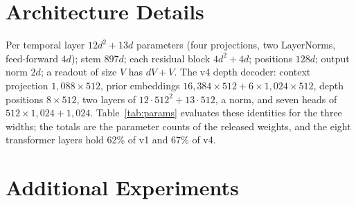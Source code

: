 \section{Architecture Details}
\label{app:params}

Per temporal layer $12d^2 + 13d$ parameters (four projections, two LayerNorms, feed-forward $4d$); stem $897d$; each residual block $4d^2 + 4d$; positions $128d$; output norm $2d$; a readout of size $V$ has $dV + V$. The v4 depth decoder: context projection $1{,}088 \times 512$, prior embeddings $16{,}384 \times 512 + 6 \times 1{,}024 \times 512$, depth positions $8 \times 512$, two layers of $12 \cdot 512^2 + 13 \cdot 512$, a norm, and seven heads of $512 \times 1{,}024 + 1{,}024$. Table~\ref{tab:params} evaluates these identities for the three widths; the totals are the parameter counts of the released weights, and the eight transformer layers hold 62\% of v1 and 67\% of v4.

\begin{table}[tb]
\centering\small
\caption{Parameter breakdown of the released encoders.}
\label{tab:params}
\end{table}

\section{Additional Experiments}
\label{app:extra}

